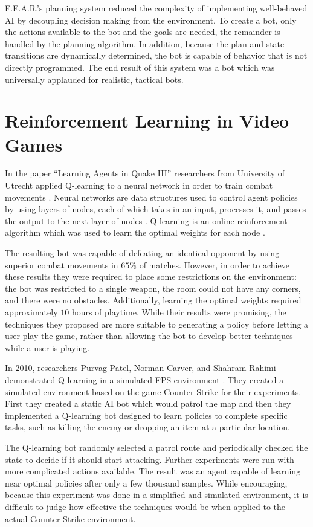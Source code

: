 F.E.A.R.'s planning system reduced the complexity of implementing well-behaved AI by decoupling decision making from the environment. To create a bot, only the actions available to the bot and the goals are needed, the remainder is handled by the planning algorithm. In addition, because the plan and state transitions are dynamically determined, the bot is capable of behavior that is not directly programmed. The end result of this system was a bot which was universally applauded for realistic, tactical bots.

\section{Reinforcement Learning in Video Games}

In the paper ``Learning Agents in Quake III'' researchers from University of Utrecht applied Q-learning to a neural network in order to train combat movements \cite{q3combat}. Neural networks are data structures used to control agent policies by using layers of nodes, each of which takes in an input, processes it, and passes the output to the next layer of nodes \cite{norvig}. Q-learning is an online reinforcement algorithm which was used to learn the optimal weights for each node \cite{norvig}.

The resulting bot was capable of defeating an identical opponent by using superior combat movements in $65\%$ of matches. However, in order to achieve these results they were required to place some restrictions on the environment: the bot was restricted to a single weapon, the room could not have any corners, and there were no obstacles. Additionally, learning the optimal weights required approximately $10$ hours of playtime. While their results were promising, the techniques they proposed are more suitable to generating a policy before letting a user play the game, rather than allowing the bot to develop better techniques while a user is playing.

In 2010, researchers Purvag Patel, Norman Carver, and Shahram Rahimi demonstrated Q-learning in a simulated FPS environment \cite{game:ai:learning}. They created a simulated environment based on the game Counter-Strike for their experiments. First they created a static AI bot which would patrol the map and then they implemented a Q-learning bot designed to learn policies to complete specific tasks, such as killing the enemy or dropping an item at a particular location.

The Q-learning bot randomly selected a patrol route and periodically checked the state to decide if it should start attacking. Further experiments were run with more complicated actions available. The result was an agent capable of learning near optimal policies after only a few thousand samples. While encouraging, because this experiment was done in a simplified and simulated environment, it is difficult to judge how effective the techniques would be when applied to the actual Counter-Strike environment.

